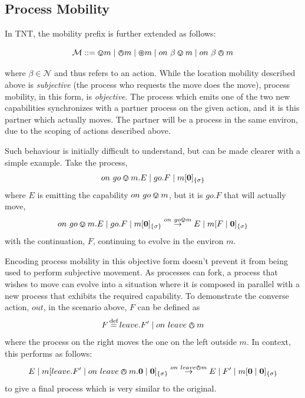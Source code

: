 \subsection{Process Mobility}
\label{procmob}

In TNT, the mobility prefix is further extended as follows:

\begin{equation}
   \text{$\mathcal{M}$} \mathrel{::=} \varovee m \mid \varowedge m \mid \varoast m 
      \mid on\ \beta \varovee m \mid on\ \beta \varowedge m
\end{equation}

\noindent where $\beta \in \mathcal{N}$ and thus refers to an action.
While the location mobility described above is \emph{subjective} (the
process who requests the move does the move), process mobility, in this form,
is \emph{objective}.  The process which emits one of the two new
capabilities synchronizes with a partner process on the given action,
and it is this partner which actually moves.  The partner will be a
process in the same environ, due to the scoping of actions described
above.

Such behaviour is initially difficult to understand, but can be made
clearer with a simple example.  Take the process,
\begin{equation}
on\ go \varovee m.E \;|\; go.F \;|\; {m}[ \textbf{0} ]_{\{\sigma\}}
\end{equation}
\noindent where $E$ is emitting the capability $on\ go \varovee m$, but it
is $go.F$ that will actually move,
\begin{equation}
on\ go \varovee m.E \;|\; go.F \;|\; {m}[ \textbf{0} ]_{\{\sigma\}} \stackrel{on\ go \varovee m}{\rightarrow}
E \;|\; {m}[ F \;|\; \textbf{0} ]_{\{\sigma\}}
\end{equation}
with the continuation, $F$, continuing to evolve in the environ $m$.   

Encoding process mobility in this objective form doesn't prevent it from
being used to perform subjective movement.  As processes can fork, a
process that wishes to move can evolve into a situation where it is
composed in parallel with a new process that exhibits the required
capability.  To demonstrate the converse action, $out$, in the scenario
above, $F$ can be defined as
\begin{equation}
F \operatorname{\stackrel{\textrm{def}}{=}} leave.F^\prime \;|\; on\ leave \varowedge m
\end{equation}
where the process on the right moves the one on the left outside $m$.
In context, this performs as follows:
\begin{equation}
E \;|\; {m}[ leave.F^\prime \;|\; on\ leave \varowedge m.\textbf{0} \;|\;
 \textbf{0} ]_{\{\sigma\}} 
\stackrel{on\ leave \varowedge m}{\rightarrow}
E \;|\; F^\prime \;|\; {m}[ \textbf{0} \;|\; \textbf{0} ]_{\{\sigma\}}
\end{equation}
to give a final process which is very similar to the original.

